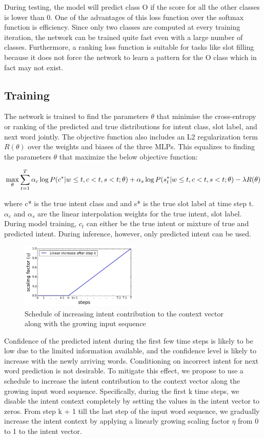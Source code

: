 During testing, the model will predict class O if the score
for all the other classes is lower than 0. One of the advantages of this loss function over the softmax function is efficiency. Since only two classes are computed at every training iteration, the network can be trained quite fast even with a large number of classes. Furthermore,
a ranking loss function is suitable for tasks like slot filling because
it does not force the network to learn a pattern for the O
class which in fact may not exist.

\subsection{Training}
The network is trained to find the parameters $\theta$ that minimise the cross-entropy or ranking  of the predicted and true distributions for intent class, slot label, and next word jointly. The objective function also includes an L2 regularization term $R(\theta)$ over the
weights and biases of the three MLPs. This equalizes to finding the parameters $\theta$ that maximize the below objective function:

\begin{equation}
\max_{\theta} \sum_{t=1}^{T} \alpha_c \log P(c^*|w \le t, c<t, s<t; \theta) \\
+ \alpha_s \log P(s^*_t|w \le t, c<t, s<t; \theta) - \lambda R(\theta)
\end{equation}

where c* is the true intent class and and s* is the
true slot label at time step t. $\alpha_c$ and $\alpha_s$ are the
linear interpolation weights for the true intent, slot
label. During model training, $c_t$ can either be the true intent or mixture
of true and predicted intent. During inference,
however, only predicted intent can be used. 
\begin{figure}
	\centering
	\includegraphics[width=0.5\textwidth]{fig/intent-g}
	\caption{Schedule of increasing intent contribution
		to the context vector along with the growing
		input sequence}
\end{figure}
Confidence of the predicted intent during the first few
time steps is likely to be low due to the limited
information available, and the confidence level is
likely to increase with the newly arriving words.
Conditioning on incorrect intent for next word prediction
is not desirable. To mitigate this effect,
we propose to use a schedule to increase the intent
contribution to the context vector along the
growing input word sequence. Specifically, during
the first k time steps, we disable the intent context
completely by setting the values in the intent
vector to zeros. From step k + 1 till the last step
of the input word sequence, we gradually increase
the intent context by applying a linearly growing
scaling factor $\eta$ from 0 to 1 to the intent vector.

